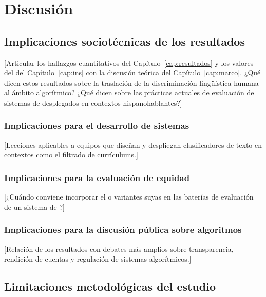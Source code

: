 \chapter{Discusión}
\label{cap:discusion}

\section{Implicaciones sociotécnicas de los resultados}
\label{sec:implicaciones}

[Articular los hallazgos cuantitativos del Capítulo~\ref{cap:resultados} y
los valores del \INS del Capítulo~\ref{cap:ins} con la discusión teórica del
Capítulo~\ref{cap:marco}. ¿Qué dicen estos resultados sobre la traslación de
la discriminación lingüística humana al ámbito algorítmico? ¿Qué dicen sobre
las prácticas actuales de evaluación de sistemas de \PLN desplegados en
contextos hispanohablantes?]

\subsection{Implicaciones para el desarrollo de sistemas}

[Lecciones aplicables a equipos que diseñan y despliegan clasificadores de
texto en contextos como el filtrado de currículums.]

\subsection{Implicaciones para la evaluación de equidad}

[¿Cuándo conviene incorporar el \INS o variantes suyas en las baterías de
evaluación de un sistema de \PLN?]

\subsection{Implicaciones para la discusión pública sobre algoritmos}

[Relación de los resultados con debates más amplios sobre transparencia,
rendición de cuentas y regulación de sistemas algorítmicos.]

\section{Limitaciones metodológicas del estudio}
\label{sec:limitaciones}

